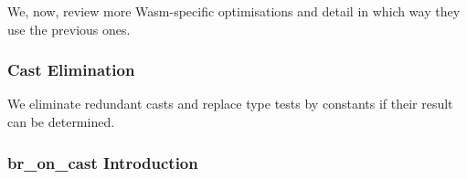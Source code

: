 \documentclass[10pt]{article}
\begin{document}
We, now, review more Wasm-specific optimisations and detail in which way they
use the previous ones.
\subsubsection{Cast Elimination}
We eliminate redundant casts and replace type tests by constants if their result
can be determined.

\subsubsection{\textsf{br\_on\_cast} Introduction}\label{broncast}
\printbibliography
\end{document}
